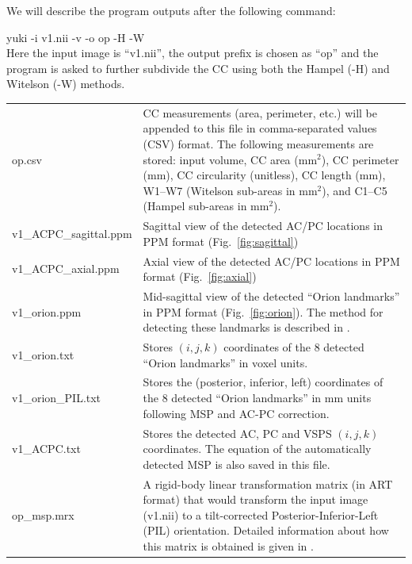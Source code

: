 \documentclass[11pt]{article}
\begin{document}

\noindent We will describe the program outputs after the following command:

yuki -i v1.nii -v -o op -H -W \\
Here the input image is ``v1.nii'', the output prefix is chosen as ``op'' and the
program is asked to further subdivide the CC using both the Hampel (-H) and Witelson (-W)
methods.

\begin{longtable}{p{}p{}}
op.csv & CC measurements (area, perimeter, etc.) will be 
appended to this file in comma-separated values (CSV) format.
The following measurements are stored: input volume, CC area (mm${}^2$), 
CC perimeter (mm), CC circularity (unitless),
CC length (mm), W1--W7 (Witelson sub-areas in mm${}^2$), 
and C1--C5 (Hampel sub-areas in mm${}^2$). \\

v1\_ACPC\_sagittal.ppm &
	Sagittal view of the detected AC/PC locations in
	PPM format (Fig.\ \ref{fig:sagittal}) \\

v1\_ACPC\_axial.ppm &
	Axial view of the detected AC/PC locations in PPM
	format (Fig.\ \ref{fig:axial}) \\

v1\_orion.ppm &
	Mid-sagittal view of the detected ``Orion landmarks'' in
	PPM format (Fig.\ \ref{fig:orion}).
	The method for detecting these landmarks is described in \citep{pmid35288224}. \\

v1\_orion.txt &
	Stores $(i, j, k)$ coordinates of the 8 detected ``Orion landmarks'' in
voxel units.\\

v1\_orion\_PIL.txt &
	Stores the (posterior, inferior, left) coordinates of the 8 detected ``Orion landmarks'' in
mm units following MSP and AC-PC correction. \\

v1\_ACPC.txt &
	Stores the detected AC, PC and VSPS $(i, j, k)$ coordinates.
	The equation of the automatically detected MSP is also saved in this file. \\

op\_msp.mrx & A rigid-body linear transformation matrix (in ART format) that
would transform the input image (v1.nii) to a tilt-corrected Posterior-Inferior-Left (PIL) 
orientation.  Detailed information about how this matrix is obtained 
is given in \citep{pmid35288224}.\\


\end{longtable}
\end{document}
